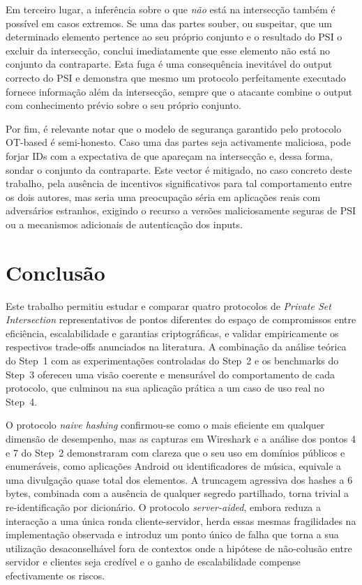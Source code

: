 Em terceiro lugar, a inferência sobre o que \emph{não} está na intersecção também é possível em casos extremos. Se uma das partes souber, ou suspeitar, que um determinado elemento pertence ao seu próprio conjunto e o resultado do PSI o excluir da intersecção, conclui imediatamente que esse elemento não está no conjunto da contraparte. Esta fuga é uma consequência inevitável do output correcto do PSI e demonstra que mesmo um protocolo perfeitamente executado fornece informação além da intersecção, sempre que o atacante combine o output com conhecimento prévio sobre o seu próprio conjunto.

Por fim, é relevante notar que o modelo de segurança garantido pelo protocolo OT-based é semi-honesto. Caso uma das partes seja activamente maliciosa, pode forjar IDs com a expectativa de que apareçam na intersecção e, dessa forma, sondar o conjunto da contraparte. Este vector é mitigado, no caso concreto deste trabalho, pela ausência de incentivos significativos para tal comportamento entre os dois autores, mas seria uma preocupação séria em aplicações reais com adversários estranhos, exigindo o recurso a versões maliciosamente seguras de PSI ou a mecanismos adicionais de autenticação dos inputs.


\clearpage
\section{Conclusão}
\label{sec:conclusao}

Este trabalho permitiu estudar e comparar quatro protocolos de \emph{Private Set Intersection} representativos de pontos diferentes do espaço de compromissos entre eficiência, escalabilidade e garantias criptográficas, e validar empiricamente os respectivos trade-offs anunciados na literatura. A combinação da análise teórica do Step~1 com as experimentações controladas do Step~2 e os benchmarks do Step~3 ofereceu uma visão coerente e mensurável do comportamento de cada protocolo, que culminou na sua aplicação prática a um caso de uso real no Step~4.

O protocolo \emph{naive hashing} confirmou-se como o mais eficiente em qualquer dimensão de desempenho, mas as capturas em Wireshark e a análise dos pontos 4 e 7 do Step~2 demonstraram com clareza que o seu uso em domínios públicos e enumeráveis, como aplicações Android ou identificadores de música, equivale a uma divulgação quase total dos elementos. A truncagem agressiva dos hashes a 6 bytes, combinada com a ausência de qualquer segredo partilhado, torna trivial a re-identificação por dicionário. O protocolo \emph{server-aided}, embora reduza a interacção a uma única ronda cliente-servidor, herda essas mesmas fragilidades na implementação observada e introduz um ponto único de falha que torna a sua utilização desaconselhável fora de contextos onde a hipótese de não-colusão entre servidor e clientes seja credível e o ganho de escalabilidade compense efectivamente os riscos.

